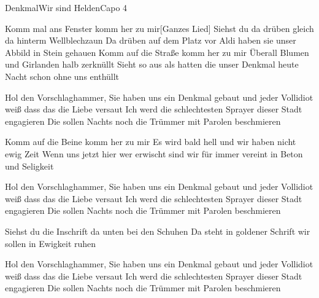 \begin{song}{Denkmal}{Wir sind Helden}{Capo 4}

Komm mal ans Fenster komm her zu mir[Ganzes Lied] 
Siehst du da drüben gleich da hinterm Wellblechzaun
Da drüben auf dem Platz vor Aldi haben sie
unser Abbild in Stein gehauen
Komm auf die Straße komm her zu mir
Überall Blumen und Girlanden halb zerknüllt
Sieht so aus als hatten die unser Denkmal heute Nacht
schon ohne uns enthüllt

Hol den Vorschlaghammer, Sie haben uns     ein Denkmal gebaut
und jeder Vollidiot weiß dass das die Liebe versaut
Ich werd die schlechtesten Sprayer dieser Stadt engagieren
Die sollen Nachts noch die Trümmer mit Parolen beschmieren

Komm auf die Beine komm her zu mir
Es wird bald hell und wir haben nicht ewig Zeit
Wenn uns jetzt hier wer erwischt sind wir für immer vereint
in Beton und Seligkeit

Hol den Vorschlaghammer, Sie haben uns     ein Denkmal gebaut
und jeder Vollidiot weiß dass das die Liebe versaut
Ich werd die schlechtesten Sprayer dieser Stadt engagieren
Die sollen Nachts noch die Trümmer mit Parolen beschmieren

Siehst du die Inschrift da unten bei den Schuhen
Da steht in goldener Schrift wir sollen in Ewigkeit ruhen

Hol den Vorschlaghammer, Sie haben uns     ein Denkmal gebaut
und jeder Vollidiot weiß dass das die Liebe versaut
Ich werd die schlechtesten Sprayer dieser Stadt engagieren
Die sollen Nachts noch die Trümmer mit Parolen beschmieren


\end{song}

